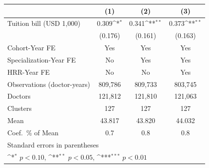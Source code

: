 {
\def\sym#1{\ifmmode^{#1}\else\(^{#1}\)\fi}
\begin{tabular}{l*{3}{c}}
\hline\hline
                    &\multicolumn{1}{c}{(1)}         &\multicolumn{1}{c}{(2)}         &\multicolumn{1}{c}{(3)}         \\
\hline
Tuition bill (USD 1,000)&       0.309\sym{*}  &       0.341\sym{**} &       0.373\sym{**} \\
                    &     (0.176)         &     (0.161)         &     (0.163)         \\
[1em]
Cohort-Year FE      &         Yes         &         Yes         &         Yes         \\
[1em]
Specialization-Year FE&          No         &         Yes         &         Yes         \\
[1em]
HRR-Year FE         &          No         &          No         &         Yes         \\
\hline
Observations (doctor-years)&     809,786         &     809,733         &     803,745         \\
Doctors             &     121,812         &     121,810         &     121,063         \\
Clusters            &         127         &         127         &         127         \\
Mean                &      43.817         &      43.820         &      44.032         \\
Coef.\ \% of Mean   &         0.7         &         0.8         &         0.8         \\
\hline\hline
\multicolumn{4}{l}{\footnotesize Standard errors in parentheses}\\
\multicolumn{4}{l}{\footnotesize \sym{*} \(p<0.10\), \sym{**} \(p<0.05\), \sym{***} \(p<0.01\)}\\
\end{tabular}
}
